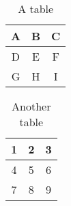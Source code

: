 \begin{table}
  \centering
  \caption{A table}
  \begin{tabular}{|c|c|c|}
    \hline
    A & B & C \\\hline
    D & E & F \\\hline
    G & H & I \\
    \hline
  \end{tabular}

  \tableSpace
\end{table}


\begin{table}
  \centering
  \caption{Another table}
  \begin{tabular}{|c|c|c|}
    \hline
    1 & 2 & 3 \\\hline
    4 & 5 & 6 \\\hline
    7 & 8 & 9 \\
    \hline
  \end{tabular}

  \tableSpace
\end{table}

